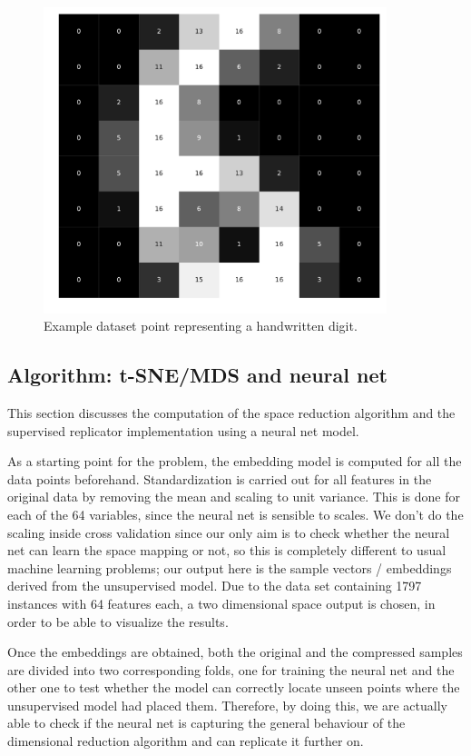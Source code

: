\documentclass[a4paper,11pt,spanish]{report}
\begin{document}
\begin{figure}[h]
\centering
\includegraphics[width=10cm]{figures/exampledigit.pdf}
\caption{\label{figuredigit}Example dataset point representing a handwritten digit.}
\end{figure}

\subsection{Algorithm: t-SNE/MDS and neural net}
\label{ssec:dra}

This section discusses the computation of the space reduction algorithm and the supervised replicator implementation using a neural net model.

As a starting point for the problem, the embedding model is computed for all the data points beforehand. Standardization is carried out for all features in the original data by removing the mean and scaling to unit variance. This is done for each of the 64 variables, since the neural net is sensible to scales. We don't do the scaling inside cross validation since our only aim is to check whether the neural net can learn the space mapping or not, so this is completely different to usual machine learning problems; our output here is the sample vectors / embeddings derived from the unsupervised model. Due to the data set containing 1797 instances with 64 features each, a two dimensional space output is chosen, in order to be able to visualize the results.

Once the embeddings are obtained, both the original and the compressed samples are divided into two corresponding folds, one for training the neural net and the other one to test whether the model can correctly locate unseen points where the unsupervised model had placed them. Therefore, by doing this, we are actually able to check if the neural net is capturing the general behaviour of the dimensional reduction algorithm and can replicate it further on.
\end{document}
